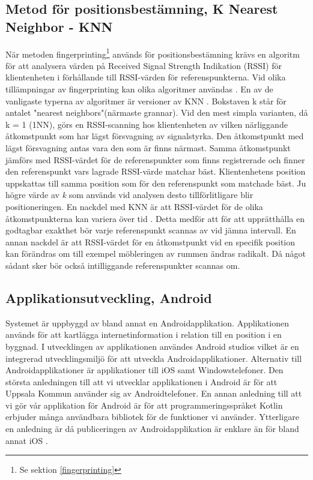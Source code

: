 \documentclass[swedish, a4paper,12pt]{article}
\begin{document}
\subsection{Metod för positionsbestämning, K Nearest Neighbor - KNN}\label{KNN}
När metoden fingerprinting\footnote{Se sektion \ref{fingerprinting}} används för positionsbestämning krävs en algoritm för att analysera värden på Received Signal Strength Indikation (RSSI) för klientenheten i förhållande till RSSI-värden för referenspunkterna. Vid olika tillämpningar av fingerprinting kan olika algoritmer användas \cite{tian2013fingerprint}\cite{jun2018low}. En av de vanligaste typerna av algoritmer är versioner av KNN \cite{tian2013fingerprint}.
Bokstaven k står för antalet "nearest neighbors"(närmaste grannar). Vid den mest simpla varianten, då k = 1 (1NN), görs en RSSI-scanning hos klientenheten av vilken närliggande åtkomstpunkt som har lägst försvagning av signalstyrka. Den åtkomstpunkt med lägst försvagning antas vara den som är finns närmast. Samma åtkomstpunkt jämförs med RSSI-värdet för de referenspunkter som finns registrerade och finner den referenspunkt vars lagrade RSSI-värde matchar bäst. Klientenhetens position uppskattas till samma position som för den referenspunkt som matchade bäst.
Ju högre värde av \textit{k} som används vid analysen desto tillförlitligare blir positioneringen\cite{yiu2017wireless}.
En nackdel med KNN är att RSSI-värdet för de olika åtkomstpunkterna kan variera över tid \cite{tian2013fingerprint}. Detta medför att för att upprätthålla en godtagbar exakthet bör varje referenspunkt scannas av vid jämna intervall.
En annan nackdel är att RSSI-värdet för en åtkomstpunkt vid en specifik position kan förändras om till exempel möbleringen av rummen ändras radikalt\cite{zanca2008experimental}. Då något sådant sker bör också intilliggande referenspunkter scannas om.

\subsection{Applikationsutveckling, Android}
Systemet är uppbyggd av bland annat en Androidapplikation. Applikationen används för att kartlägga internetinformation i relation till en position i en byggnad. I utvecklingen av applikationen användes Android studios vilket är en integrerad utvecklingsmiljö för att utveckla Androidapplikationer. Alternativ till Androidapplikationer är applikationer till iOS samt Windowstelefoner. Den största anledningen till att vi utvecklar applikationen i Android är för att Uppsala Kommun använder sig av Androidtelefoner. En annan anledning till att vi gör vår applikation för Android är för att programmeringsspråket Kotlin erbjuder många användbara bibliotek för de funktioner vi använder. Ytterligare en anledning är då publiceringen av Androidapplikation är enklare än för bland annat iOS \cite{submitIphone}\cite{android}.
\end{document}
